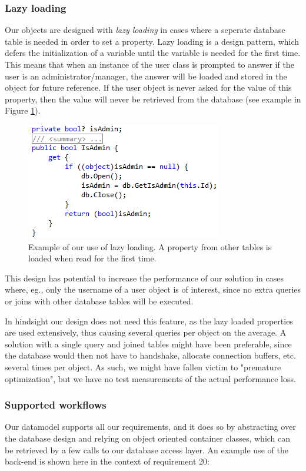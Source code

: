 \subsubsection{Lazy loading}

Our objects are designed with \emph{lazy loading} in cases where a seperate database table is needed in order to set a property. Lazy loading is a design pattern, which defers the initialization of a variable until the variable is needed for the first time. This means that when an instance of the user class is prompted to answer if the user is an administrator/manager, the answer will be loaded and stored in the object for future reference. If the user object is never asked for the value of this property, then the value will never be retrieved from the database (see example in Figure \ref{fig:lazyload}).

\begin{figure}[hbt]
	\centering
	\includegraphics[scale=0.8]{./p1design/lazyload.png}
	\caption{Example of our use of lazy loading. A property from other tables is loaded when read for the first time.}
	\label{fig:lazyload}
\end{figure}


This design has potential to increase the performance of our solution in cases where, eg., only the username of a user object is of interest, since no extra queries or joins with other database tables will be executed.

In hindsight our design does not need this feature, as the lazy loaded properties are used extensively, thus causing several queries per object on the average. A solution with a single query and joined tables might have been preferable, since the database would then not have to handshake, allocate connection buffers, etc. several times per object. As such, we might have fallen victim to "premature optimization"\cite{premoptim}, but we have no test measurements of the actual performance loss.


\subsubsection{Supported workflows}
Our datamodel supports all our requirements, and it
does so by abstracting over the database design and relying on object oriented
container classes, which can be retrieved by a few calls to our database access
layer. An example use of the back-end is shown here in the context of requirement 20:

